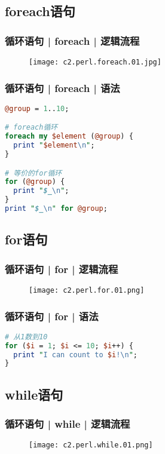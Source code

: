 \subsection{foreach语句}
\begin{frame}
  \frametitle{循环语句 | foreach | 逻辑流程}
  \begin{figure}
    \centering
    \texttt{[image: c2.perl.foreach.01.jpg]}
  \end{figure}
\end{frame}

\begin{frame}[fragile]
  \frametitle{循环语句 | foreach | \alert{语法}}
\begin{lstlisting}[language=Perl]
@group = 1..10;

# foreach循环
foreach my $element (@group) {
  print "$element\n";
}

# 等价的for循环
for (@group) {
  print "$_\n";
}
print "$_\n" for @group;
\end{lstlisting}
\end{frame}

\subsection{for语句}
\begin{frame}
  \frametitle{循环语句 | for | 逻辑流程}
  \begin{figure}
    \centering
    \texttt{[image: c2.perl.for.01.png]}
  \end{figure}
\end{frame}

\begin{frame}[fragile]
  \frametitle{循环语句 | for | \alert{语法}}
\begin{lstlisting}[language=Perl]
# 从1数到10
for ($i = 1; $i <= 10; $i++) {
  print "I can count to $i!\n";
}
\end{lstlisting}
\end{frame}

\subsection{while语句}
\begin{frame}
  \frametitle{循环语句 | while | 逻辑流程}
  \begin{figure}
    \centering
    \texttt{[image: c2.perl.while.01.png]}
  \end{figure}
\end{frame}

